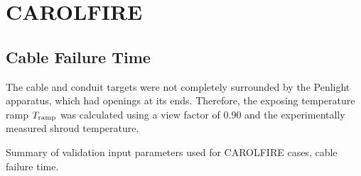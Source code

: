 \clearpage


\section{CAROLFIRE}

\subsection*{Cable Failure Time}

The cable and conduit targets were not completely surrounded by the Penlight apparatus, which had openings at its ends. Therefore, the exposing temperature ramp $T\sb{ramp}$ was calculated using a view factor of 0.90 and the experimentally measured shroud temperature.

\begin{table}[!ht]
\caption[Validation input parameters for CAROLFIRE cases, cable failure time]
{Summary of validation input parameters used for CAROLFIRE cases, cable failure time.}


\end{table}
